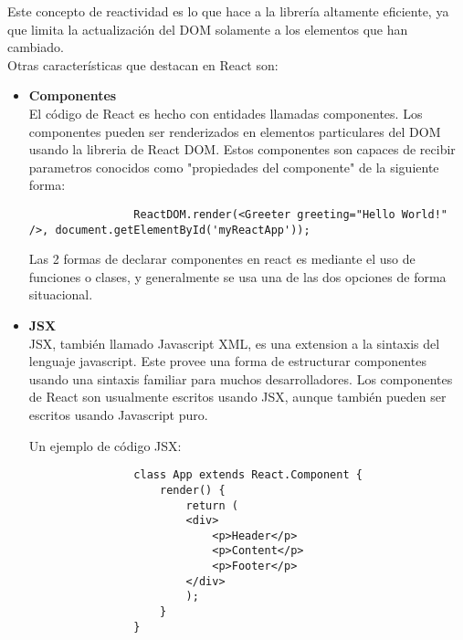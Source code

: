         Este concepto de reactividad es lo que hace a la librería altamente eficiente, ya que limita la actualización del DOM solamente a los elementos que han cambiado.\\

        Otras características que destacan en React son:\\

        \begin{itemize}
            \item \textbf{Componentes} \hfill \\

            El código de React es hecho con entidades llamadas componentes. Los componentes pueden ser renderizados en elementos particulares del DOM usando la libreria de React DOM. Estos componentes son capaces de recibir parametros conocidos como "propiedades del componente" de la siguiente forma: \hfill \\

            \begin{lstlisting}
                ReactDOM.render(<Greeter greeting="Hello World!" />, document.getElementById('myReactApp'));
            \end{lstlisting}

            Las 2 formas de declarar componentes en react es mediante el uso de funciones o clases, y generalmente se usa una de las dos opciones de forma situacional.

            \item \textbf{JSX} \hfill \\

            JSX, también llamado Javascript XML, es una extension a la sintaxis del lenguaje javascript. Este provee una forma de estructurar componentes usando una sintaxis familiar para muchos desarrolladores. Los componentes de React son usualmente escritos usando JSX, aunque también pueden ser escritos usando Javascript puro.

            Un ejemplo de código JSX:

            \begin{lstlisting}
                class App extends React.Component {
                    render() {
                        return (
                        <div>
                            <p>Header</p>
                            <p>Content</p>
                            <p>Footer</p>
                        </div>
                        );
                    }
                }
            \end{lstlisting}


\end{itemize}
